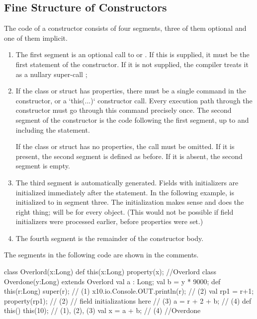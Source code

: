 \subsection{Fine Structure of Constructors}
\label{SFineStructCtors}

The code of a constructor consists of four segments, three of them optional
and one of them implicit.
\begin{enumerate}
\item The first segment is an optional call to  or
      .  If this is supplied, it must be the first statement
      of the constructor.  If it is not supplied, the compiler treats it as a
      nullary super-call ;
\item If the class or struct has properties, there must be a single
       command in the constructor, or a \xcd`this(...)`
      constructor call.  Every execution path
      through the constructor must go through this  command
      precisely once.   The second segment of the constructor is the code
      following the first segment, up to and including the 
      statement.

      If the class or struct has no properties, the  call must
      be omitted. If it is present, the second segment is defined as before.  If
      it is absent, the second segment is empty.
\item The third segment is automatically generated.  Fields with initializers
      are initialized immediately after the  statement.
      In the following example,  is initialized to  in
      segment three.  The initialization makes sense and does the right
      thing;  will be  for every  object.
      (This would not be possible if field initializers were processed
      earlier, before properties were set.)
\item The fourth segment is the remainder of the constructor body.
\end{enumerate}

The segments in the following code are shown in the comments.
\begin{xten}
class Overlord(x:Long) {
  def this(x:Long) { property(x); }
}//Overlord
class Overdone(y:Long) extends Overlord  {
  val a : Long;
  val b =  y * 9000;
  def this(r:Long) {
    super(r);                      // (1)
    x10.io.Console.OUT.println(r); // (2)
    val rp1 = r+1;
    property(rp1);                 // (2)
    // field initializations here  // (3)
    a = r + 2 + b;                 // (4)
  }
  def this() {
    this(10);                      // (1), (2), (3)
    val x = a + b;                 // (4)
  }
}//Overdone
\end{xten}
%

